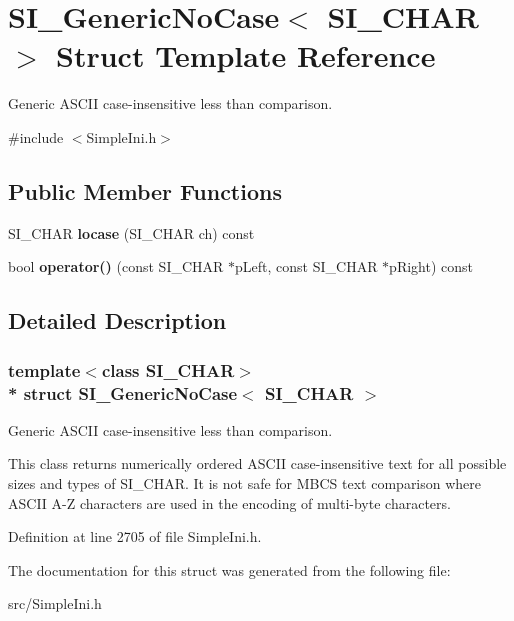 \hypertarget{struct_s_i___generic_no_case}{}\section{S\+I\+\_\+\+Generic\+No\+Case$<$ S\+I\+\_\+\+C\+H\+AR $>$ Struct Template Reference}
\label{struct_s_i___generic_no_case}


Generic A\+S\+C\+II case-\/insensitive less than comparison.  




{\ttfamily \#include $<$Simple\+Ini.\+h$>$}

\subsection*{Public Member Functions}
\begin{DoxyCompactItemize}
\item 
S\+I\+\_\+\+C\+H\+AR {\bfseries locase} (S\+I\+\_\+\+C\+H\+AR ch) const \hypertarget{struct_s_i___generic_no_case_adc6bb2ca8960d24913b598a2f3085e7c}{}\label{struct_s_i___generic_no_case_adc6bb2ca8960d24913b598a2f3085e7c}

\item 
bool {\bfseries operator()} (const S\+I\+\_\+\+C\+H\+AR $\ast$p\+Left, const S\+I\+\_\+\+C\+H\+AR $\ast$p\+Right) const \hypertarget{struct_s_i___generic_no_case_aa8014f86b3d74b2cd0f6e9b6ccc43426}{}\label{struct_s_i___generic_no_case_aa8014f86b3d74b2cd0f6e9b6ccc43426}

\end{DoxyCompactItemize}


\subsection{Detailed Description}
\subsubsection*{template$<$class S\+I\+\_\+\+C\+H\+AR$>$\\*
struct S\+I\+\_\+\+Generic\+No\+Case$<$ S\+I\+\_\+\+C\+H\+A\+R $>$}

Generic A\+S\+C\+II case-\/insensitive less than comparison. 

This class returns numerically ordered A\+S\+C\+II case-\/insensitive text for all possible sizes and types of S\+I\+\_\+\+C\+H\+AR. It is not safe for M\+B\+CS text comparison where A\+S\+C\+II A-\/Z characters are used in the encoding of multi-\/byte characters. 

Definition at line 2705 of file Simple\+Ini.\+h.



The documentation for this struct was generated from the following file\+:\begin{DoxyCompactItemize}
\item 
src/Simple\+Ini.\+h\end{DoxyCompactItemize}
